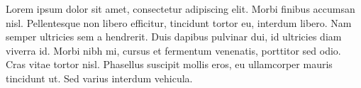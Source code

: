 Lorem ipsum dolor sit amet, consectetur adipiscing elit. Morbi finibus accumsan nisl. Pellentesque non libero efficitur, tincidunt tortor eu, interdum libero. Nam semper ultricies sem a hendrerit. Duis dapibus pulvinar dui, id ultricies diam viverra id. Morbi nibh mi, cursus et fermentum venenatis, porttitor sed odio. Cras vitae tortor nisl. Phasellus suscipit mollis eros, eu ullamcorper mauris tincidunt ut. Sed varius interdum vehicula. 
